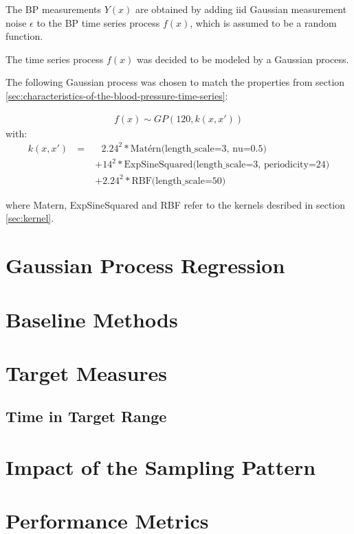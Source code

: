 The BP measurements $Y(x)$ are obtained by adding iid Gaussian measurement noise
$\epsilon$ to the BP time series process $f(x)$, which is assumed
to be a random function.

The time series process $f(x)$ was decided to be modeled by a Gaussian process.

The following Gaussian process was chosen to match the properties from
section \ref{sec:characteristics-of-the-blood-pressure-time-series}:

\begin{gather*}
    f(x) \sim GP(120, k(x,x'))
\end{gather*}
with:
\begin{align*}
    k(x, x') \text{ } = &\text{ } 2.24^{2} * \text{Matérn(length\_scale=3, nu=0.5)} \\
             &+  14^{2} * \text{ExpSineSquared(length\_scale=3, periodicity=24)} \\
             &+  2.24^{2} * \text{RBF(length\_scale=50)}
\end{align*}


where Matern, ExpSineSquared and RBF refer to the kernels desribed in
section \ref{sec:kernel}.



\section{Gaussian Process Regression}\label{sec:gaussian-process-regression}


\section{Baseline Methods}\label{sec:baseline-methods}


\section{Target Measures}\label{sec:target-measures}

\subsection{Time in Target Range}




\section{Impact of the Sampling Pattern}\label{sec:adversarial-analysis}


\section{Performance Metrics}\label{sec:performance-metric}




















